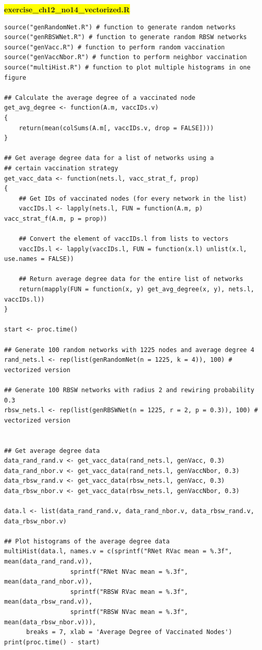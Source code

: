 \documentclass[11pt]{article}
\newcommand{\mybox}{%
    \collectbox{%
        \setlength{\fboxsep}{2pt}%
        \fbox{\BOXCONTENT}%
    }%
}
\begin{document}
\vspace{10mm}

\noindent\mybox{\colorbox{yellow}{\textbf{exercise\_ch12\_no14\_vectorized.R}}}\hspace{3mm}\hrulefill
\begin{lstlisting}
source("genRandomNet.R") # function to generate random networks
source("genRBSWNet.R") # function to generate random RBSW networks
source("genVacc.R") # function to perform random vaccination
source("genVaccNbor.R") # function to perform neighbor vaccination
source("multiHist.R") # function to plot multiple histograms in one figure

## Calculate the average degree of a vaccinated node
get_avg_degree <- function(A.m, vaccIDs.v)
{
	return(mean(colSums(A.m[, vaccIDs.v, drop = FALSE])))
}

## Get average degree data for a list of networks using a 
## certain vaccination strategy 
get_vacc_data <- function(nets.l, vacc_strat_f, prop)
{
	## Get IDs of vaccinated nodes (for every network in the list)
	vaccIDs.l <- lapply(nets.l, FUN = function(A.m, p) vacc_strat_f(A.m, p = prop))

	## Convert the element of vaccIDs.l from lists to vectors
	vaccIDs.l <- lapply(vaccIDs.l, FUN = function(x.l) unlist(x.l, use.names = FALSE))
	
	## Return average degree data for the entire list of networks
	return(mapply(FUN = function(x, y) get_avg_degree(x, y), nets.l, vaccIDs.l))
}

start <- proc.time()

## Generate 100 random networks with 1225 nodes and average degree 4
rand_nets.l <- rep(list(genRandomNet(n = 1225, k = 4)), 100) # vectorized version

## Generate 100 RBSW networks with radius 2 and rewiring probability 0.3
rbsw_nets.l <- rep(list(genRBSWNet(n = 1225, r = 2, p = 0.3)), 100) # vectorized version


## Get average degree data
data_rand_rand.v <- get_vacc_data(rand_nets.l, genVacc, 0.3)
data_rand_nbor.v <- get_vacc_data(rand_nets.l, genVaccNbor, 0.3)
data_rbsw_rand.v <- get_vacc_data(rbsw_nets.l, genVacc, 0.3)
data_rbsw_nbor.v <- get_vacc_data(rbsw_nets.l, genVaccNbor, 0.3)

data.l <- list(data_rand_rand.v, data_rand_nbor.v, data_rbsw_rand.v, data_rbsw_nbor.v)

## Plot histograms of the average degree data
multiHist(data.l, names.v = c(sprintf("RNet RVac mean = %.3f", mean(data_rand_rand.v)),
			      sprintf("RNet NVac mean = %.3f", mean(data_rand_nbor.v)),
			      sprintf("RBSW RVac mean = %.3f", mean(data_rbsw_rand.v)),
			      sprintf("RBSW NVac mean = %.3f", mean(data_rbsw_nbor.v))),
	  breaks = 7, xlab = 'Average Degree of Vaccinated Nodes')
print(proc.time() - start)

\end{lstlisting}
\end{document}
